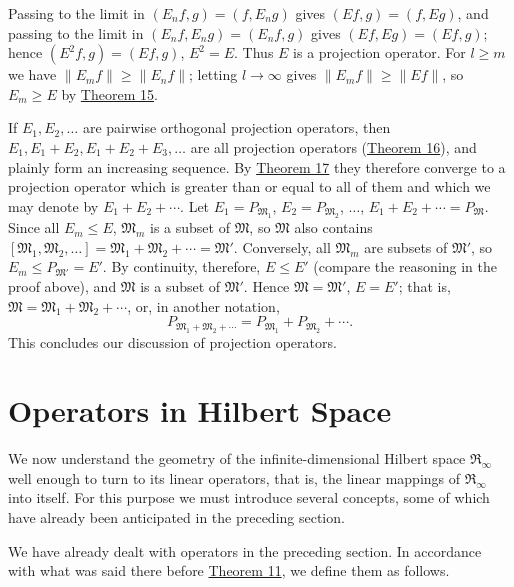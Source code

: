 \documentclass[fontsize=13pt,twoside,openany,headings=normal,parskip=false,bookmarkpackage=false,DIV=calc]{scrbook}
\begin{document}
\hypertarget{origpage-46}{}%
Passing to the limit in $(E_nf,g)=(f,E_ng)$ gives $(Ef,g)=(f,Eg)$, and passing to the limit in $(E_nf,E_ng)=(E_nf,g)$ gives $(Ef,Eg)=(Ef,g)$; hence $(E^2f,g)=(Ef,g)$, $E^2=E$. Thus $E$ is a projection operator. For $l\geq m$ we have $\|E_mf\|\geq\|E_nf\|$; letting $l\to\infty$ gives $\|E_mf\|\geq\|Ef\|$, so $E_m\geq E$ by \hyperref[thm:II.15]{Theorem 15}.

If $E_1,E_2,\ldots$ are pairwise orthogonal projection operators, then $E_1,E_1+E_2,E_1+E_2+E_3,\ldots$ are all projection operators (\hyperref[thm:II.16]{Theorem 16}), and plainly form an increasing sequence. By \hyperref[thm:II.17]{Theorem 17} they therefore converge to a projection operator which is greater than or equal to all of them and which we may denote by $E_1+E_2+\cdots$. Let $E_1=P_{\mathfrak{M}_1}$, $E_2=P_{\mathfrak{M}_2}$, $\ldots$, $E_1+E_2+\cdots=P_{\mathfrak{M}}$. Since all $E_m\leq E$, $\mathfrak{M}_m$ is a subset of $\mathfrak{M}$, so $\mathfrak{M}$ also contains $[\mathfrak{M}_1,\mathfrak{M}_2,\ldots]=\mathfrak{M}_1+\mathfrak{M}_2+\cdots=\mathfrak{M}'$. Conversely, all $\mathfrak{M}_m$ are subsets of $\mathfrak{M}'$, so $E_m\leq P_{\mathfrak{M}'}=E'$. By continuity, therefore, $E\leq E'$ (compare the reasoning in the proof above), and $\mathfrak{M}$ is a subset of $\mathfrak{M}'$. Hence $\mathfrak{M}=\mathfrak{M}'$, $E=E'$; that is, $\mathfrak{M}=\mathfrak{M}_1+\mathfrak{M}_2+\cdots$, or, in another notation,
\[
P_{\mathfrak{M}_1+\mathfrak{M}_2+\cdots}=P_{\mathfrak{M}_1}+P_{\mathfrak{M}_2}+\cdots.
\]
This concludes our discussion of projection operators.

\section{Operators in Hilbert Space}\label{sec:II.5}
We now understand the geometry of the infinite-dimensional Hilbert space $\mathfrak{R}_\infty$ well enough to turn to its linear operators, that is, the linear mappings of $\mathfrak{R}_\infty$ into itself. For this purpose we must introduce several concepts, some of which have already been anticipated in the preceding section.

We have already dealt with operators in the preceding section. In accordance with what was said there before \hyperref[thm:II.11]{Theorem 11}, we define them as follows.
\end{document}
